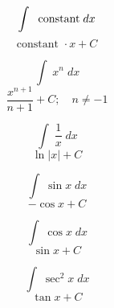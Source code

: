 \documentclass[avery5371,grid]{flashcards}
\begin{document}
\begin{flashcard}{\large \vspace*{\fill} \[ \int\; \text{ \normalfont constant} \;dx  \] \vspace*{\fill}   }{\large \vspace*{\fill} \[ \text{constant } \cdot x + C  \] \vspace*{\fill}   }\end{flashcard}

\begin{flashcard}{\large \vspace*{\fill} \[ \int\; x^n \;dx  \] \vspace*{\fill}   }{\large \vspace*{\fill} \[ \dfrac{x^{n+1}}{n+1} + C ; \quad n \neq -1  \] \vspace*{\fill}   }\end{flashcard}

\begin{flashcard}{\large \vspace*{\fill} \[ \int\; \dfrac{1}{x} \;dx \] \vspace*{\fill}   }{\large \vspace*{\fill} \[ \ln|x| + C  \] \vspace*{\fill}   }\end{flashcard}

\begin{flashcard}{\large \vspace*{\fill} \[ \int\; \sin x \;dx  \] \vspace*{\fill}   }{\large \vspace*{\fill} \[ -\cos x + C  \] \vspace*{\fill}   }\end{flashcard}

\begin{flashcard}{\large \vspace*{\fill} \[ \int\; \cos x \;dx \] \vspace*{\fill}   }{\large \vspace*{\fill} \[ \sin x + C  \] \vspace*{\fill}   }\end{flashcard}

\begin{flashcard}{\large \vspace*{\fill} \[ \int\; \sec^2 x \;dx  \] \vspace*{\fill}   }{\large \vspace*{\fill} \[ \tan x + C \] \vspace*{\fill}   }\end{flashcard}
\end{document}
